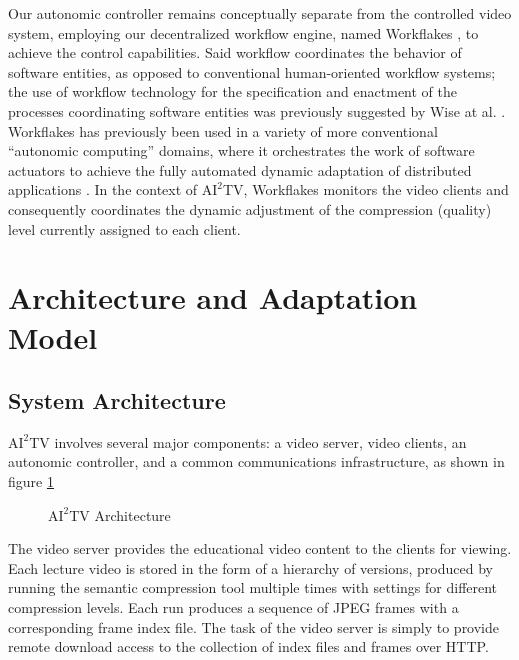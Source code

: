 \documentclass{sig-alternate}
\begin{document}
Our autonomic controller remains conceptually separate from the
controlled video system, employing our decentralized workflow engine,
named Workflakes \cite{ValettoThesis}, to achieve the control
capabilities.  Said workflow coordinates the behavior of software
entities, as opposed to conventional human-oriented workflow systems;
the use of workflow technology for the specification and enactment of
the processes coordinating software entities was previously suggested
by Wise at al. \cite{OSTERWEIL}.  Workflakes has previously been used
in a variety of more conventional ``autonomic computing'' domains,
where it orchestrates the work of software actuators to achieve the
fully automated dynamic adaptation of distributed applications
\cite{ICSE,AMS,AMSJournal}.  In the context of $\mathrm{AI}^2$TV,
Workflakes monitors the video clients and consequently coordinates the
dynamic adjustment of the compression (quality) level currently
assigned to each client.


\section{Architecture and Adaptation\\ Model}

\subsection{System Architecture}


$\mathrm{AI}^2$TV involves several major components: a video server, video
clients, an autonomic controller, and a common communications
infrastructure, as shown in figure \ref{ai2tv_arch}

\begin{figure}
  \centering
  \caption{$\mathrm{AI}^2$TV Architecture}
  \label{ai2tv_arch}
\end{figure}


The video server provides the educational video content to the clients
for viewing.  Each lecture video is stored in the form of a hierarchy
of versions, produced by running the semantic compression tool
multiple times with settings for different compression levels. Each
run produces a sequence of JPEG frames with a corresponding frame
index file.  The task of the video server is simply to provide remote
download access to the collection of index files and frames over HTTP.
\end{document}
